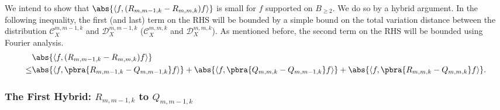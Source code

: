 We intend to show that $\abs{\left\langle f,(R_{m,m-1,k}-R_{m,m,k})f\right\rangle}$ is small for $f$ supported on $B_{\geq 2}$. We do so by a hybrid argument. In the following inequality, the first (and last) term on the RHS will be bounded by a simple bound on the total variation distance between the distribution $\mathcal{C}_X^{m,m-1,k}$ and $\mathcal{D}_X^{m,m-1,k}$ ($\mathcal{C}_X^{m,m,k}$ and $\mathcal{D}_X^{m,m,k}$). As mentioned before, the second term on the RHS will be bounded using Fourier analysis.
\begin{align*}\label{eq:hybrid}
    &\abs{\left\langle f,(R_{m,m-1,k}-R_{m,m,k})f\right\rangle} \\
        \leq& \abs{\left\langle f,\pbra{R_{m,m-1,k}-Q_{m,m-1,k}}f\right\rangle}+ \abs{\left\langle f,\pbra{Q_{m,m,k}-Q_{m,m-1,k}}f\right\rangle}+\abs{\left\langle f,\pbra{R_{m,m,k}-Q_{m,m,k}}f\right\rangle}.
\end{align*}


\subsubsection{The First Hybrid: $R_{m,m-1,k}$ to $Q_{m,m-1,k}$}

